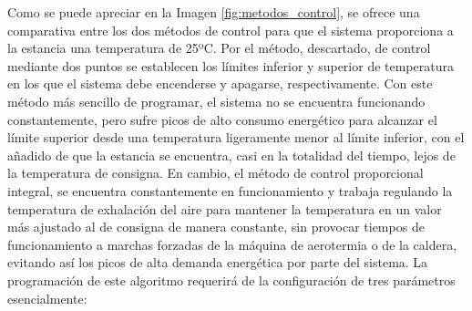 \begin{itemize}
Como se puede apreciar en la Imagen \ref{fig:metodos_control}, se ofrece una comparativa entre los dos métodos de control para que el sistema proporciona a la estancia una temperatura de 25ºC. Por el método, descartado, de control mediante dos puntos se establecen los límites inferior y superior de temperatura en los que el sistema debe encenderse y apagarse, respectivamente. Con este método más sencillo de programar, el sistema no se encuentra funcionando constantemente, pero sufre picos de alto consumo energético para alcanzar el límite superior desde una temperatura ligeramente menor al límite inferior, con el añadido de que la estancia se encuentra, casi en la totalidad del tiempo, lejos de la temperatura de consigna. En cambio, el método de control proporcional integral, se encuentra constantemente en funcionamiento y trabaja regulando la temperatura de exhalación del aire para mantener la temperatura en un valor más ajustado al de consigna de manera constante, sin provocar tiempos de funcionamiento a marchas forzadas de la máquina de aerotermia o de la caldera, evitando así los picos de alta demanda energética por parte del sistema. La programación de este algoritmo requerirá de la configuración de tres parámetros esencialmente:
	

\end{itemize}
